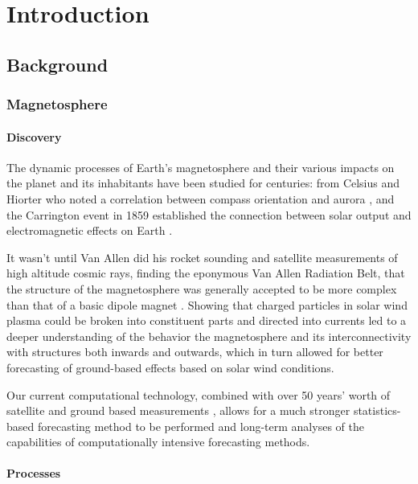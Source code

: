 
\chapter[Introduction]{Introduction}

\section{Background}

\subsection{Magnetosphere}

\subsubsection{Discovery}
The dynamic processes of Earth's magnetosphere and their various impacts on the planet and its inhabitants have been studied for centuries: from Celsius and Hiorter who noted a correlation between compass orientation and aurora \cite{Maunder}, and the Carrington event in 1859 established the connection between solar output and electromagnetic effects on Earth \cite{Carrington}. 

It wasn't until Van Allen did his rocket sounding and satellite measurements of high altitude cosmic rays, finding the eponymous Van Allen Radiation Belt, that the structure of the magnetosphere was generally accepted to be more complex than that of a basic dipole magnet \cite{MagnetoHistory}. Showing that charged particles in solar wind plasma could be broken into constituent parts and directed into currents led to a deeper understanding of the behavior the magnetosphere and its interconnectivity with structures both inwards and outwards, which in turn allowed for better forecasting of ground-based effects based on solar wind conditions.

Our current computational technology, combined with over 50 years' worth of satellite and ground based measurements \cite{HistMagnetometer}, allows for a much stronger statistics-based forecasting method to be performed and long-term analyses of the capabilities of computationally intensive forecasting methods.


\subsubsection{Processes}

